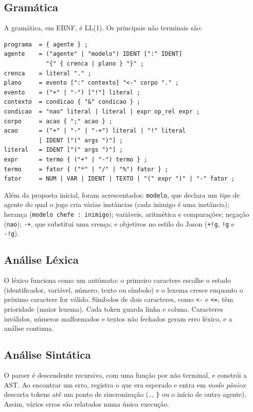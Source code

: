 \documentclass[conference]{IEEEtran}
\begin{document}
\subsection{Gramática}
A gramática, em EBNF, é LL(1). Os principais não terminais são:
\begin{lstlisting}
programa  = { agente } ;
agente    = ("agente" | "modelo") IDENT [":" IDENT]
            "{" { crenca | plano } "}" ;
crenca    = literal "." ;
plano     = evento [":" contexto] "<-" corpo "." ;
evento    = ("+" | "-") ["!"] literal ;
contexto  = condicao { "&" condicao } ;
condicao  = "nao" literal | literal | expr op_rel expr ;
corpo     = acao { ";" acao } ;
acao      = ("+" | "-" | "-+") literal | "!" literal
          | IDENT ["(" args ")"] ;
literal   = IDENT ["(" args ")"] ;
expr      = termo { ("+" | "-") termo } ;
termo     = fator { ("*" | "/" | "%") fator } ;
fator     = NUM | VAR | IDENT | TEXTO | "(" expr ")" | "-" fator ;
\end{lstlisting}
Além da proposta inicial, foram acrescentados: \texttt{modelo}, que declara um \textit{tipo} de agente do qual o jogo cria várias instâncias (cada inimigo é uma instância); herança (\texttt{modelo chefe : inimigo}); variáveis, aritmética e comparações; negação (\texttt{nao}); \texttt{-+}, que substitui uma crença; e objetivos no estilo do Jason (\texttt{+!g}, \texttt{!g} e \texttt{-!g}).

\subsection{Análise Léxica}
O léxico funciona como um autômato: o primeiro caractere escolhe o estado (identificador, variável, número, texto ou símbolo) e o lexema cresce enquanto o próximo caractere for válido. Símbolos de dois caracteres, como \texttt{<-} e \texttt{<=}, têm prioridade (maior lexema). Cada token guarda linha e coluna. Caracteres inválidos, números malformados e textos não fechados geram erro léxico, e a análise continua.

\subsection{Análise Sintática}
O parser é descendente recursivo, com uma função por não terminal, e constrói a AST. Ao encontrar um erro, registra o que era esperado e entra em \textit{modo pânico}: descarta tokens até um ponto de sincronização (\texttt{.}, \texttt{\}} ou o início de outro agente). Assim, vários erros são relatados numa única execução.
\end{document}
